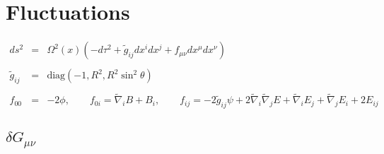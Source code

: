 \documentclass[10pt,letterpaper]{article}
\numberwithin{equation}{section}
\begin{document}
\section{Fluctuations}
% 
%
\begin{eqnarray}
ds^2 &=& \Omega^2(x)(-d\tau^2 + \tilde g_{ij} dx^i dx^j + f_{\mu\nu} dx^\mu dx^\nu)
\\ \nonumber\\
\tilde g_{ij} &=& \text{diag}(-1,R^2,R^2\sin^2\theta)
\\ \nonumber\\
f_{00} &=& -2\phi,\qquad f_{0i}= \tilde \nabla_i B + B_i,\qquad 
f_{ij} = -2 \tilde g_{ij}\psi + 2\tilde\nabla_i\tilde \nabla_j E + \tilde \nabla_i E_j + \tilde \nabla_j E_i + 2E_{ij}
\end{eqnarray}
%
\subsection{$\delta G_{\mu\nu}$}
\end{document}
